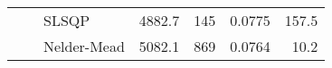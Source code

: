 \begin{tabular}{|l|l|l|r|r|r|r|}
                                                                                                  &                                   & SLSQP                                   & 4882.7                                                                                            & 145                                                                                                        & 0.0775                                                                                                          & 157.5                                                                                                          \\ \cline{3-7} 
                                                                                                  &                                   & Nelder-Mead                             & 5082.1                                                                                            & 869                                                                                                        & 0.0764                                                                                                          & 10.2                                                                                                           \\ \hline
\end{tabular}